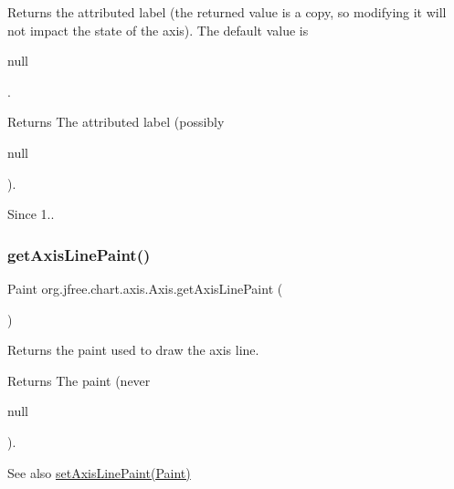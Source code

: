 Returns the attributed label (the returned value is a copy, so modifying it will not impact the state of the axis). The default value is
\begin{DoxyCode}
null 
\end{DoxyCode}
 .

\begin{DoxyReturn}{Returns}
The attributed label (possibly
\begin{DoxyCode}
null 
\end{DoxyCode}
 ).
\end{DoxyReturn}
\begin{DoxySince}{Since}
1.. 
\end{DoxySince}
\mbox{\label{classorg_1_1jfree_1_1chart_1_1axis_1_1_axis_a6d10951b7f082f0857398d5fa30642d2}} 
\subsubsection{\texorpdfstring{get\+Axis\+Line\+Paint()}{getAxisLinePaint()}}
{\footnotesize\ttfamily Paint org.\+jfree.\+chart.\+axis.\+Axis.\+get\+Axis\+Line\+Paint (\begin{DoxyParamCaption}{ }\end{DoxyParamCaption})}

Returns the paint used to draw the axis line.

\begin{DoxyReturn}{Returns}
The paint (never
\begin{DoxyCode}
null 
\end{DoxyCode}
 ).
\end{DoxyReturn}
\begin{DoxySeeAlso}{See also}
\mbox{\hyperlink{classorg_1_1jfree_1_1chart_1_1axis_1_1_axis_a8b7c2af897382eca7088d489f60db36d}{set\+Axis\+Line\+Paint(\+Paint)}} 
\end{DoxySeeAlso}
\mbox{\label{classorg_1_1jfree_1_1chart_1_1axis_1_1_axis_ab999e7ef49b87ddc75e07eb5658661b5}} 

